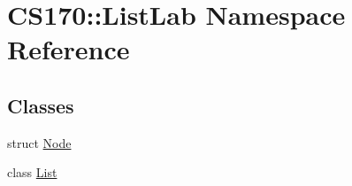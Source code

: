 \hypertarget{namespace_c_s170_1_1_list_lab}{\section{C\-S170\-:\-:List\-Lab Namespace Reference}
\label{namespace_c_s170_1_1_list_lab}
}
\subsection*{Classes}
\begin{DoxyCompactItemize}
\item 
struct \hyperlink{struct_c_s170_1_1_list_lab_1_1_node}{Node}
\item 
class \hyperlink{class_c_s170_1_1_list_lab_1_1_list}{List}
\end{DoxyCompactItemize}
